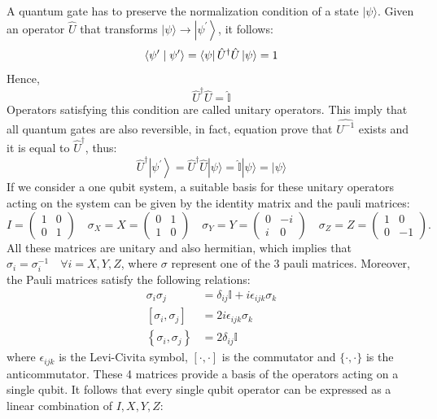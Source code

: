A quantum gate has to preserve the normalization condition of a state $|\psi\rangle$. Given an operator $\hat{U}$ that transforms $|\psi\rangle \rightarrow\left|\psi^{\prime}\right\rangle$, it follows:
$$
\left\langle\psi^{\prime} \mid \psi^{\prime}\right\rangle =\bra{\psi}\hat{U}^{\dagger} \hat{U}\ket{\psi}=1
$$
Hence, 
$$
 \hat{U}^{\dagger} \hat{U}=\widehat{\mathbb{I}}
$$
Operators satisfying this condition are called unitary operators. This imply that all quantum gates are also reversible, in fact, equation  prove that $\hat{U^{-1}}$ exists and it is equal to $\hat{U}^{\dagger}$, thus:
$$
\hat{U}^{\dagger}\left|\psi^{\prime}\right\rangle=\hat{U}^{\dagger} \hat{U}|\psi\rangle=\hat{\mathbb{I}}|\psi\rangle=|\psi\rangle
$$
If we consider a one qubit system, a suitable basis for these unitary operators acting on the system can be given by the identity matrix and the pauli matrices: 
$$
I=\left(\begin{array}{cc}
1 & 0 \\
0 & 1
\end{array}\right) \quad  \sigma_X=X=\left(\begin{array}{cc}
0 & 1 \\
1 & 0
\end{array}\right) \quad 
\sigma_Y=Y=\left(\begin{array}{cc}
0 & -i \\
i & 0
\end{array}\right) \quad
\sigma_Z=Z=\left(\begin{array}{cc}
1 & 0 \\
0 & -1
\end{array}\right).
$$
All these matrices are unitary and also hermitian, which implies that $\sigma_i=\sigma_i^{-1} \quad \forall i = X,Y,Z$, where $\sigma$ represent one of the 3 pauli matrices. Moreover, the Pauli matrices satisfy the following relations:
$$
\begin{aligned}
\sigma_{i} \sigma_{j} &=\delta_{i j} \mathbb{I}+i \epsilon_{i j k} \sigma_{k} \\
\left[\sigma_{i}, \sigma_{j}\right] &=2 i \epsilon_{i j k} \sigma_{k} \\
\left\{\sigma_{i}, \sigma_{j}\right\} &=2 \delta_{i j} \mathbb{I}
\end{aligned}
$$
where $\epsilon_{i j k}$ is the Levi-Civita symbol, $[\cdot, \cdot]$ is the commutator and $\{\cdot, \cdot\}$ is the
anticommutator.
These 4 matrices provide a basis of the operators acting on a single qubit. It follows that every single qubit operator can be expressed as a linear combination of $I,X,Y,Z$: 
